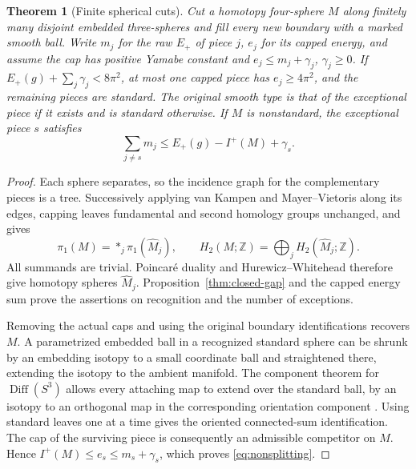 \documentclass[11pt]{article}
\numberwithin{equation}{section}
\newtheorem{theorem}{Theorem}[section]
\theoremstyle{definition}
\theoremstyle{remark}
\begin{document}
\begin{theorem}[Finite spherical cuts]\label{thm:nonsplitting}
Cut a homotopy four-sphere \(M\) along finitely many disjoint
embedded three-spheres and fill every new boundary with
a marked smooth ball. Write \(m_j\) for the raw \(E_+\) of piece
\(j\), \(e_j\) for its capped energy, and assume the cap has
positive Yamabe constant and \(e_j\le m_j+\gamma_j\), \(\gamma_j\ge0\).
If \(E_+(g)+\sum_j\gamma_j<8\pi^2\), at most one capped piece
has \(e_j\ge4\pi^2\), and the remaining pieces are standard.
The original smooth type is that of the exceptional piece if it
exists and is standard otherwise. If \(M\) is nonstandard, the
exceptional piece \(s\) satisfies
\begin{equation}\label{eq:nonsplitting}
 \sum_{j\ne s}m_j\le E_+(g)-I^+(M)+\gamma_s.
\end{equation}
\end{theorem}

\begin{proof}
Each sphere separates, so the incidence graph for the
complementary pieces is a tree. Successively applying van Kampen
and Mayer--Vietoris along its edges, capping leaves fundamental
and second homology groups unchanged, and gives
\[
 \pi_1(M)=*_{j}\pi_1(\widehat M_j),\qquad
 H_2(M;\mathbb Z)=\bigoplus_j H_2(\widehat M_j;\mathbb Z).
\]
All summands are trivial. Poincaré duality and Hurewicz--Whitehead
therefore give homotopy spheres \(\widehat M_j\).
Proposition~\ref{thm:closed-gap} and the capped energy sum prove the
assertions on recognition and the number of exceptions.

Removing the actual caps and using the original boundary
identifications recovers \(M\). A parametrized embedded ball
in a recognized standard sphere can be shrunk by an
embedding isotopy to a small coordinate ball and straightened
there, extending the isotopy to the ambient manifold. The
component theorem for \(\operatorname{Diff}(S^3)\) allows every
attaching map to extend over the standard ball, by an isotopy
to an orthogonal map in the corresponding orientation component
\cite[p.~553 and the main theorem]{Hatcher1983Smale}. Using
standard leaves one at a time gives the oriented connected-sum
identification. The cap of the surviving piece is consequently
an admissible competitor on \(M\). Hence
\(I^+(M)\le e_s\le m_s+\gamma_s\), which proves \eqref{eq:nonsplitting}.
\end{proof}
\end{document}
